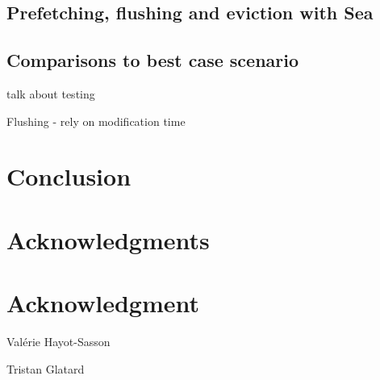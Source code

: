 \documentclass[10pt,journal,compsoc]{IEEEtran}
\begin{document}
\subsection{Prefetching, flushing and eviction with Sea}
\subsection{Comparisons to best case scenario}

talk about testing


Flushing - rely on modification time
\section{Conclusion}
%


\ifCLASSOPTIONcompsoc
  \section*{Acknowledgments}
\else
  \section*{Acknowledgment}
\fi

\ifCLASSOPTIONcaptionsoff
  \newpage
\fi




\begin{IEEEbiography}{Val\'erie Hayot-Sasson}
\end{IEEEbiography}
\begin{IEEEbiography}{Tristan Glatard}
\end{IEEEbiography}
\end{document}
